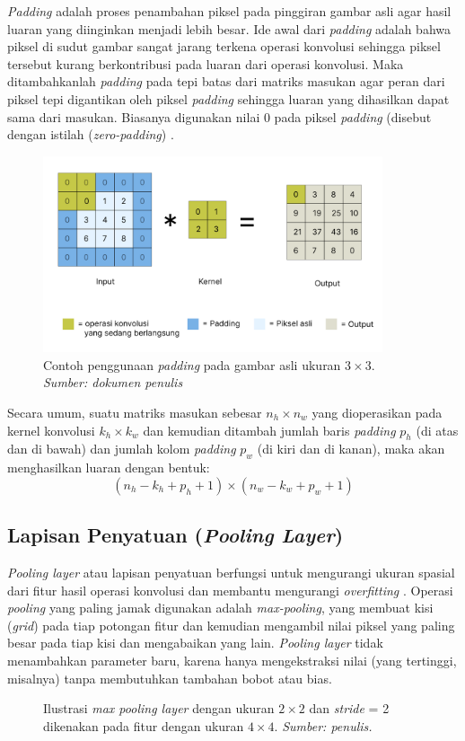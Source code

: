 \emph{Padding} adalah proses penambahan piksel pada pinggiran gambar asli agar hasil luaran yang diinginkan menjadi lebih besar. Ide awal dari \emph{padding} adalah bahwa piksel di sudut gambar sangat jarang terkena operasi konvolusi sehingga piksel tersebut kurang berkontribusi pada luaran dari operasi konvolusi. Maka ditambahkanlah \emph{padding} pada tepi batas dari matriks masukan agar peran dari piksel tepi digantikan oleh piksel \emph{padding} sehingga luaran yang dihasilkan dapat sama dari masukan. Biasanya digunakan nilai $0$ pada piksel \emph{padding} (disebut dengan istilah (\emph{zero-padding}) \citep{Li_Li_Gao}.

\begin{figure}[h]
    \centering
    \includegraphics[width=10cm]{gambar/padding.png}
    \caption{Contoh penggunaan \emph{padding} pada gambar asli ukuran $3 \times 3$.\\ \emph{Sumber: dokumen penulis}}
    \label{padding}
\end{figure}

Secara umum, suatu matriks masukan sebesar $n_h \times n_w$ yang dioperasikan pada kernel konvolusi $k_h \times k_w$ dan kemudian ditambah jumlah baris \emph{padding} $p_h$ (di atas dan di bawah) dan jumlah kolom \emph{padding} $p_w$ (di kiri dan di kanan), maka akan menghasilkan luaran dengan bentuk:
\begin{equation}
    \left(n_h - k_h + p_h +1\right) \times \left(n_w - k_w + p_w + 1\right)
\end{equation}

\subsection{Lapisan Penyatuan (\emph{Pooling Layer})}
\emph{Pooling layer} atau lapisan penyatuan berfungsi untuk mengurangi ukuran spasial dari fitur hasil operasi konvolusi dan membantu mengurangi \emph{overfitting} \citep{zocca_spacagna_slater_roelants_2017}. Operasi \emph{pooling} yang paling jamak digunakan adalah \emph{max-pooling}, yang membuat kisi (\emph{grid}) pada tiap potongan fitur dan kemudian mengambil nilai piksel yang paling besar pada tiap kisi dan mengabaikan yang lain. \emph{Pooling layer} tidak menambahkan parameter baru, karena hanya mengekstraksi nilai (yang tertinggi, misalnya) tanpa membutuhkan tambahan bobot atau bias.
\begin{figure}[h]
    \centering
    
    \caption{Ilustrasi \emph{max pooling layer} dengan ukuran $2 \times 2$ dan \emph{stride} = 2 dikenakan pada fitur dengan ukuran $4 \times 4$. \emph{Sumber: penulis.} }
    \label{max_pooling}
\end{figure}

